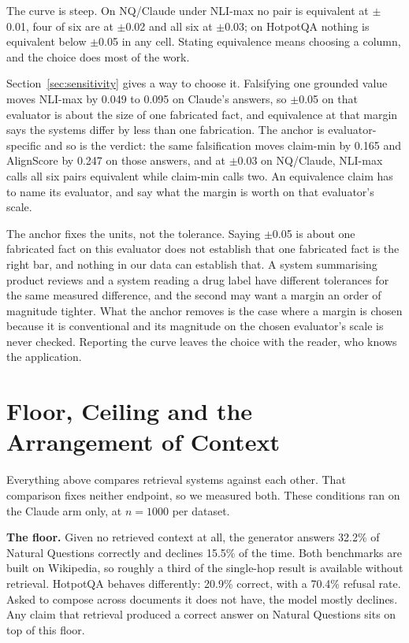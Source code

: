 \documentclass[11pt]{article}
\begin{document}
The curve is steep. On NQ/Claude under NLI-max no pair is equivalent at $\pm$0.01, four of six are at $\pm$0.02 and all six at $\pm$0.03; on HotpotQA nothing is equivalent below $\pm$0.05 in any cell. Stating equivalence means choosing a column, and the choice does most of the work.

Section~\ref{sec:sensitivity} gives a way to choose it. Falsifying one grounded value moves NLI-max by 0.049 to 0.095 on Claude's answers, so $\pm$0.05 on that evaluator is about the size of one fabricated fact, and equivalence at that margin says the systems differ by less than one fabrication. The anchor is evaluator-specific and so is the verdict: the same falsification moves claim-min by 0.165 and AlignScore by 0.247 on those answers, and at $\pm$0.03 on NQ/Claude, NLI-max calls all six pairs equivalent while claim-min calls two. An equivalence claim has to name its evaluator, and say what the margin is worth on that evaluator's scale.

The anchor fixes the units, not the tolerance. Saying $\pm$0.05 is about one fabricated fact on this evaluator does not establish that one fabricated fact is the right bar, and nothing in our data can establish that. A system summarising product reviews and a system reading a drug label have different tolerances for the same measured difference, and the second may want a margin an order of magnitude tighter. What the anchor removes is the case where a margin is chosen because it is conventional and its magnitude on the chosen evaluator's scale is never checked. Reporting the curve leaves the choice with the reader, who knows the application.



\section{Floor, Ceiling and the Arrangement of Context}
\label{sec:anchors}

Everything above compares retrieval systems against each other. That comparison fixes neither endpoint, so we measured both. These conditions ran on the Claude arm only, at $n = 1000$ per dataset.

\textbf{The floor.} Given no retrieved context at all, the generator answers 32.2\% of Natural Questions correctly and declines 15.5\% of the time. Both benchmarks are built on Wikipedia, so roughly a third of the single-hop result is available without retrieval. HotpotQA behaves differently: 20.9\% correct, with a 70.4\% refusal rate. Asked to compose across documents it does not have, the model mostly declines. Any claim that retrieval produced a correct answer on Natural Questions sits on top of this floor.
\end{document}
